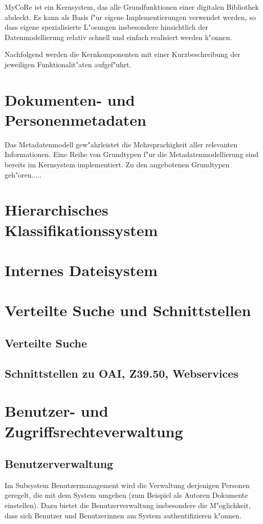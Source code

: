 MyCoRe ist ein Kernsystem, das alle Grundfunktionen einer digitalen Bibliothek abdeckt.
Es kann als Basis f"ur eigene Implementierungen verwendet werden, so dass
eigene spezialisierte L"osungen insbesondere hinsichtlich der Datenmodellierung
relativ schnell und einfach realisiert werden k"onnen.

Nachfolgend werden die Kernkomponenten mit einer Kurzbeschreibung der jeweiligen
Funktionalit"aten aufgef"uhrt.

\section{Dokumenten- und Personenmetadaten}
Das Metadatenmodell gew"ahrleistet die Mehrsprachigkeit aller relevanten Informationen.
Eine Reihe von Grundtypen f"ur die Metadatenmodellierung sind bereits im Kernsystem
implementiert.
Zu den angebotenen Grundtypen geh"oren.....

\section{Hierarchisches Klassifikationssystem}
\section{Internes Dateisystem}

\section{Verteilte Suche und Schnittstellen}
\subsection{Verteilte Suche}
\subsection{Schnittstellen zu OAI, Z39.50, Webservices}

\section{Benutzer- und Zugriffsrechteverwaltung}
\subsection{Benutzerverwaltung}
\label{sec:LeistungsumfangUsermanagement} 
Im Subsystem Benutzermanagement wird die Verwaltung derjenigen Personen geregelt,
die mit dem System umgehen (zum Beispiel als Autoren Dokumente einstellen). 
Dazu bietet die Benutzerverwaltung insbesondere die M"oglichkeit, dass sich Benutzer 
und Benutzerinnen am System authentifizieren k"onnen.

